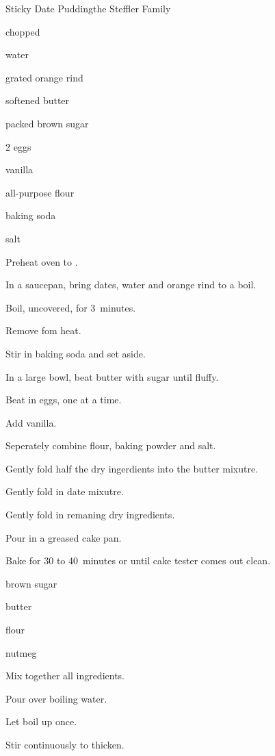 \begin{recipe}{Sticky Date Pudding}{the Steffler Family}

\begin{ingredients}
\item \C{1\threequarter} chopped 
\item {} water
\item {} grated orange rind
\item \C{\half} softened butter
\item \C{\third} packed brown sugar
\item 2 eggs
\item {} vanilla
\item \C{1\quarter} all-purpose flour
\item {} baking soda
\item \tp{\half} salt
\end{ingredients}

\begin{directions}
\item Preheat oven to .
\item In a saucepan, bring dates, water and orange rind to a boil.
\item Boil, uncovered, for 3~minutes.
\item Remove fom heat.
\item Stir in baking soda and set aside.
\item In a large bowl, beat butter with sugar until fluffy.
\item Beat in eggs, one at a time.
\item Add vanilla.
\item Seperately combine flour, baking powder and salt.
\item Gently fold half the dry ingerdients into the butter mixutre.
\item Gently fold in date mixutre.
\item Gently fold in remaning dry ingredients.
\item Pour in a greased cake pan.
\item Bake for 30 to 40~minutes or until cake tester comes out clean.
\end{directions}


\begin{ingredients}
\item {} brown sugar
\item {} butter
\item {} flour
\item nutmeg
\end{ingredients}

\begin{directions}
\item Mix together all ingredients.
\item Pour over  boiling water.
\item Let boil up once.
\item Stir continuously to thicken.
\end{directions}
\end{recipe}
